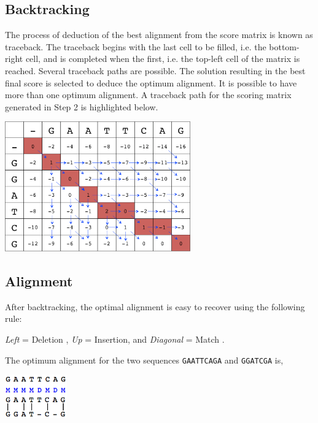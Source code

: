 \documentclass[english, a4paper,11pt]{article}
\begin{document}
\subsection{Backtracking}
The process of deduction of the best alignment from the score matrix is known as traceback. 
The traceback begins with the last cell to be filled, i.e. the bottom-right cell, and is 
completed when the first, i.e. the top-left cell of the matrix is reached. Several 
traceback paths are possible. The solution resulting in the best final score is selected 
to deduce the optimum alignment. It is possible to have more than one optimum alignment. 
A traceback path for the scoring matrix generated in Step 2 is highlighted below.

\begin{center}
\includegraphics[width=0.6\textwidth]{backtracking.png}
\end{center}

\subsection{Alignment}

After backtracking, the optimal alignment is easy to recover using the following rule:

 \emph{Left} = Deletion , \emph{Up} = Insertion, and \emph{Diagonal} = Match .

The optimum alignment for the two sequences \texttt{GAATTCAGA} and \texttt{GGATCGA} is,

\begin{center}
\includegraphics[width=0.2\textwidth]{alignment.png}
\end{center}
\end{document}
